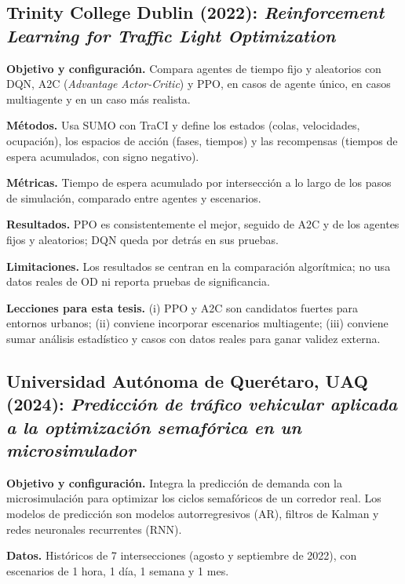 \subsection[Trinity College Dublin (2022)]{Trinity College Dublin (2022): \textit{Reinforcement Learning for Traffic Light Optimization} \citep{Chakrabarti2022}}

\noindent\textbf{Objetivo y configuración.} Compara agentes de tiempo fijo y aleatorios con DQN, A2C (\textit{Advantage Actor-Critic}) y PPO, en casos de agente único, en casos multiagente y en un caso más realista.

\noindent\textbf{Métodos.} Usa SUMO con TraCI y define los estados (colas, velocidades, ocupación), los espacios de acción (fases, tiempos) y las recompensas (tiempos de espera acumulados, con signo negativo).

\noindent\textbf{Métricas.} Tiempo de espera acumulado por intersección a lo largo de los pasos de simulación, comparado entre agentes y escenarios.

\noindent\textbf{Resultados.} PPO es consistentemente el mejor, seguido de A2C y de los agentes fijos y aleatorios; DQN queda por detrás en sus pruebas.

\noindent\textbf{Limitaciones.} Los resultados se centran en la comparación algorítmica; no usa datos reales de OD ni reporta pruebas de significancia.

\noindent\textbf{Lecciones para esta tesis.} (i) PPO y A2C son candidatos fuertes para entornos urbanos; (ii) conviene incorporar escenarios multiagente; (iii) conviene sumar análisis estadístico y casos con datos reales para ganar validez externa.

\subsection[Universidad Autónoma de Querétaro (2024)]{Universidad Autónoma de Querétaro, UAQ (2024): \textit{Predicción de tráfico vehicular aplicada a la optimización semafórica en un microsimulador} \citep{UAQ2024}}

\noindent\textbf{Objetivo y configuración.} Integra la predicción de demanda con la microsimulación para optimizar los ciclos semafóricos de un corredor real. Los modelos de predicción son modelos autorregresivos (AR), filtros de Kalman y redes neuronales recurrentes (RNN).

\noindent\textbf{Datos.} Históricos de 7 intersecciones (agosto y septiembre de 2022), con escenarios de 1 hora, 1 día, 1 semana y 1 mes.

